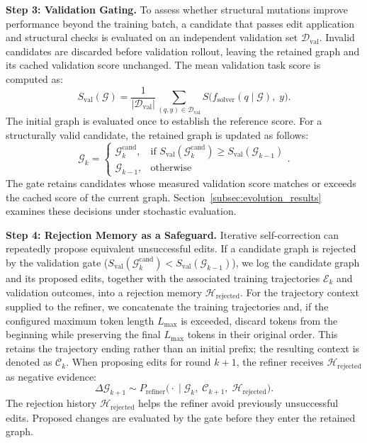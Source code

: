 \noindent\textbf{Step 3: Validation Gating.}
To assess whether structural mutations improve performance beyond the training batch, a candidate that passes edit application and structural checks is evaluated on an independent validation set $\mathcal{D}_{\text{val}}$. Invalid candidates are discarded before validation rollout, leaving the retained graph and its cached validation score unchanged. The mean validation task score is computed as:
\begin{equation}
    S_{\text{val}}(\mathcal{G}) = \frac{1}{|\mathcal{D}_{\text{val}}|} \sum_{(q, y) \in \mathcal{D}_{\text{val}}} S\big( f_{\text{solver}}(q \mid \mathcal{G}), \; y \big).
\end{equation}
The initial graph is evaluated once to establish the reference score. For a structurally valid candidate, the retained graph is updated as follows:
\begin{equation}
    \mathcal{G}_k = 
    \begin{cases} 
        \mathcal{G}_k^{\text{cand}}, & \text{if } S_{\text{val}}(\mathcal{G}_k^{\text{cand}}) \ge S_{\text{val}}(\mathcal{G}_{k-1}) \\ 
        \mathcal{G}_{k-1}, & \text{otherwise} 
    \end{cases}.
\end{equation}
The gate retains candidates whose measured validation score matches or exceeds the cached score of the current graph. Section~\ref{subsec:evolution_results} examines these decisions under stochastic evaluation.

\noindent\textbf{Step 4: Rejection Memory as a Safeguard.}
Iterative self-correction can repeatedly propose equivalent unsuccessful edits. If a candidate graph is rejected by the validation gate ($S_{\text{val}}(\mathcal{G}_k^{\text{cand}}) < S_{\text{val}}(\mathcal{G}_{k-1})$), we log the candidate graph and its proposed edits, together with the associated training trajectories $\mathcal{E}_k$ and validation outcomes, into a rejection memory $\mathcal{H}_{\text{rejected}}$. For the trajectory context supplied to the refiner, we concatenate the training trajectories and, if the configured maximum token length $L_{\max}$ is exceeded, discard tokens from the beginning while preserving the final $L_{\max}$ tokens in their original order. This retains the trajectory ending rather than an initial prefix; the resulting context is denoted as $\mathcal{C}_k$. When proposing edits for round $k+1$, the refiner receives $\mathcal{H}_{\text{rejected}}$ as negative evidence:
\begin{equation}
    \Delta\mathcal{G}_{k+1} \sim P_{\text{refiner}}\big(\cdot \;\big|\; \mathcal{G}_k, \; \mathcal{C}_{k+1}, \; \mathcal{H}_{\text{rejected}}\big).
\end{equation}
The rejection history $\mathcal{H}_{\text{rejected}}$ helps the refiner avoid previously unsuccessful edits. Proposed changes are evaluated by the gate before they enter the retained graph.

